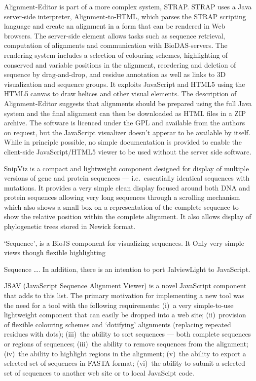 \documentclass[a4]{article}
\begin{document}
Alignment-Editor is part of a more complex system, STRAP. STRAP uses a
Java server-side interpreter, Alignment-to-HTML\cite{gille:2014},
which parses the STRAP scripting language and create an alignment in a
form that can be rendered in Web browsers. The server-side element
allows tasks such as sequence retrieval, computation of alignments and
communication with BioDAS-servers. The rendering system includes a
selection of colouring schemes, highlighting of conserved and variable
positions in the alignment, reordering and deletion of sequence by
drag-and-drop, and residue annotation as well as links to 3D
visualization and sequence groups. It exploits JavaScript and HTML5
using the HTML5 canvas to draw helices and other visual elements.  The
description of Alignment-Editor\cite{gille:2014aa} suggests that
alignments should be prepared using the full Java system and the final
alignment can then be downloaded as HTML files in a ZIP archive. The
software is licenced under the GPL and available from the authors on
request, but the JavaScript visualizer doesn't apperar to be available
by itself. While in principle possible, no simple documentation is
provided to enable the client-side JavaScript/HTML5 viewer to be used
without the server side software.

SnipViz is a compact and lightweight component designed for display 
of multiple versions of gene and protein sequences ---
i.e.\ essentially identical sequences with mutations.
It provides a very simple clean display focused around both DNA and
protein sequences allowing very long sequences through a scrolling
mechanism which also shows a small box on a representation of the
complete sequence to show the relative position within the complete
alignment.  It also allows display of phylogenetic trees stored in
Newick format.

`Sequence', is a BioJS component for visualizing sequences. It
Only very simple views though flexible highlighting



Sequence \ldots.
In addition, there is an intention to port JalviewLight to
JavaScript.

JSAV (JavaScript Sequence Alignment Viewer) is a novel JavaScript
component that adds to this list. The primary motivation for
implementing a new tool was the need for a tool with the following
requirements: (i)~a very simple-to-use lightweight component that can
easily be dropped into a web site; (ii)~provision of flexible
colouring schemes and `dotifying' alignments (replacing repeated
residues with dots); (iii)~the ability to sort sequences --- both
complete sequences or regions of sequences; (iii)~the ability to
remove sequences from the alignment; (iv)~the ability to highlight
regions in the alignment; (v)~the ability to export a selected set of
sequences in FASTA format; (vi)~the ability to submit a selected set
of sequences to another web site or to local JavaScipt code.
\end{document}
